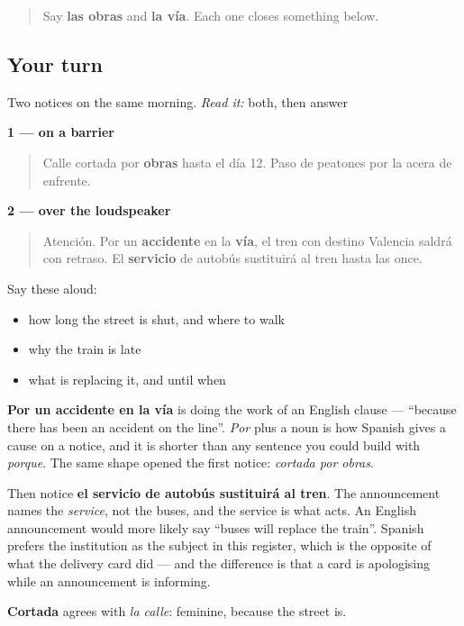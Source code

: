 \label{lesson:ES-C454-sintesis-corte}



\begin{quote}
Say \textbf{las obras} and \textbf{la vía}. Each one closes something below.
\end{quote}

\subsection*{Your turn}
Two notices on the same morning. \emph{Read it:} both, then answer

\textbf{1 — on a barrier}

\begin{quote}
Calle cortada por \textbf{obras} hasta el día 12. Paso de peatones por la acera de enfrente.
\end{quote}

\textbf{2 — over the loudspeaker}

\begin{quote}
Atención. Por un \textbf{accidente} en la \textbf{vía}, el tren con destino Valencia saldrá con retraso. El \textbf{servicio} de autobús sustituirá al tren hasta las once.
\end{quote}

Say these aloud:

\begin{itemize}
\raggedright
  \item how long the street is shut, and where to walk
  \item why the train is late
  \item what is replacing it, and until when
\end{itemize}

\begin{culture}
\textbf{Por un accidente en la vía} is doing the work of an English clause — \textquotedblleft{}because there has been an accident on the line\textquotedblright{}. \emph{Por} plus a noun is how Spanish gives a cause on a notice, and it is shorter than any sentence you could build with \emph{porque}. The same shape opened the first notice: \emph{cortada por obras}.

Then notice \textbf{el servicio de autobús sustituirá al tren}. The announcement names the \emph{service}, not the buses, and the service is what acts. An English announcement would more likely say \textquotedblleft{}buses will replace the train\textquotedblright{}. Spanish prefers the institution as the subject in this register, which is the opposite of what the delivery card did — and the difference is that a card is apologising while an announcement is informing.

\textbf{Cortada} agrees with \emph{la calle}: feminine, because the street is.
\end{culture}

